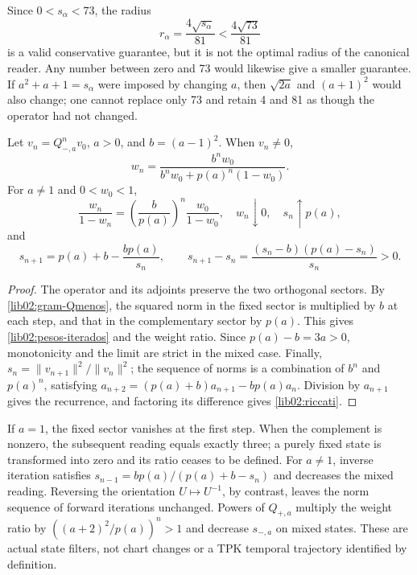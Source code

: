 Since \(0<s_\alpha<73\), the radius
\[
 r_\alpha=\frac{4\sqrt{s_\alpha}}{81}<\frac{4\sqrt{73}}{81}
\]
is a valid conservative guarantee, but it is not the optimal radius of the canonical reader. Any number between zero and 73 would likewise give a smaller guarantee. If \(a^2+a+1=s_\alpha\) were imposed by changing \(a\), then \(\sqrt{2a}\) and \((a+1)^2\) would also change; one cannot replace only 73 and retain 4 and 81 as though the operator had not changed.

\begin{theorem}
\label{lib02:iteraciones}
Let \(v_n=Q_{-,a}^nv_0\), \(a>0\), and \(b=(a-1)^2\). When \(v_n\ne0\),
\begin{equation}
 w_n=\frac{b^nw_0}{b^nw_0+p(a)^n(1-w_0)}.
 \label{lib02:pesos-iterados}
\end{equation}
For \(a\ne1\) and \(0<w_0<1\),
\[
 \frac{w_n}{1-w_n}
 =\left(\frac b{p(a)}\right)^n\frac{w_0}{1-w_0},
 \quad w_n\downarrow0,\quad s_n\uparrow p(a),
\]
and
\begin{equation}
 s_{n+1}=p(a)+b-\frac{bp(a)}{s_n},\qquad
 s_{n+1}-s_n=\frac{(s_n-b)(p(a)-s_n)}{s_n}>0.
 \label{lib02:riccati}
\end{equation}
\end{theorem}
\begin{proof}
The operator and its adjoints preserve the two orthogonal sectors. By \eqref{lib02:gram-Qmenos}, the squared norm in the fixed sector is multiplied by \(b\) at each step, and that in the complementary sector by \(p(a)\). This gives \eqref{lib02:pesos-iterados} and the weight ratio. Since \(p(a)-b=3a>0\), monotonicity and the limit are strict in the mixed case. Finally, \(s_n=\|v_{n+1}\|^2/\|v_n\|^2\); the sequence of norms is a combination of \(b^n\) and \(p(a)^n\), satisfying \(a_{n+2}=(p(a)+b)a_{n+1}-bp(a)a_n\). Division by \(a_{n+1}\) gives the recurrence, and factoring its difference gives \eqref{lib02:riccati}.
\end{proof}

If \(a=1\), the fixed sector vanishes at the first step. When the complement is nonzero, the subsequent reading equals exactly three; a purely fixed state is transformed into zero and its ratio ceases to be defined. For \(a\ne1\), inverse iteration satisfies \(s_{n-1}=bp(a)/(p(a)+b-s_n)\) and decreases the mixed reading. Reversing the orientation \(U\mapsto U^{-1}\), by contrast, leaves the norm sequence of forward iterations unchanged. Powers of \(Q_{+,a}\) multiply the weight ratio by \(((a+2)^2/p(a))^n>1\) and decrease \(s_{-,a}\) on mixed states. These are actual state filters, not chart changes or a TPK temporal trajectory identified by definition.

